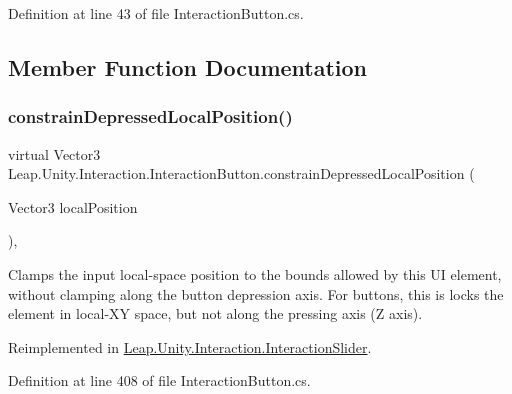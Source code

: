 Definition at line 43 of file Interaction\+Button.\+cs.



\subsection{Member Function Documentation}
\mbox{\label{class_leap_1_1_unity_1_1_interaction_1_1_interaction_button_a8e073f9ac38439194d9b96de35362eca}} 
\subsubsection{\texorpdfstring{constrainDepressedLocalPosition()}{constrainDepressedLocalPosition()}}
{\footnotesize\ttfamily virtual Vector3 Leap.\+Unity.\+Interaction.\+Interaction\+Button.\+constrain\+Depressed\+Local\+Position (\begin{DoxyParamCaption}\item[{Vector3}]{local\+Position }\end{DoxyParamCaption})\hspace{0.3cm}{\ttfamily [protected]}, {\ttfamily [virtual]}}



Clamps the input local-\/space position to the bounds allowed by this UI element, without clamping along the button depression axis. For buttons, this is locks the element in local-\/\+XY space, but not along the pressing axis (Z axis). 



Reimplemented in \mbox{\hyperlink{class_leap_1_1_unity_1_1_interaction_1_1_interaction_slider_a8c06bb5258dd92f60e1dd42e65617028}{Leap.\+Unity.\+Interaction.\+Interaction\+Slider}}.



Definition at line 408 of file Interaction\+Button.\+cs.

\mbox{\label{class_leap_1_1_unity_1_1_interaction_1_1_interaction_button_a6a0addc3c33852bd432f177faf307e9e}} 

